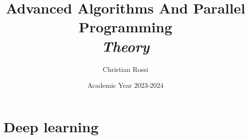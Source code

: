 \documentclass[12pt, a4paper]{report}
\title{Advanced Algorithms And Parallel Programming \\ \textit{Theory}}
\author{Christian Rossi}
\date{Academic Year 2023-2024}
\begin{document}
    \maketitle

    

    \cleardoublepage

    \tableofcontents

    \cleardoublepage

    \chapter{Deep learning}
    
\end{document}
